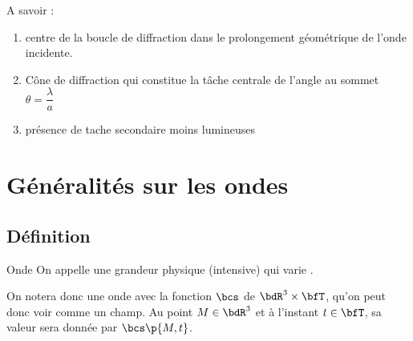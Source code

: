     \begin{minipage}{0.5\linewidth}
        \begin{center}
        \end{center}
    \end{minipage}
    \hfill
    \begin{minipage}{0.5\linewidth}
        A savoir :
        \begin{enumerate}
            \item centre de la boucle de diffraction dans le prolongement géométrique de l'onde incidente.
        
            \item Cône de diffraction qui constitue la tâche centrale de l'angle au sommet $\theta = \dfrac{\lambda}{a}$
            
            \item présence de tache secondaire moins lumineuses
        \end{enumerate}
    \end{minipage}
    
    \section{Généralités sur les ondes}

    \subsection{Définition}
    
    \begin{definition}{Onde}{}
        On appelle  une grandeur physique (intensive) qui varie .
    \end{definition}
    \begin{notation}
        On notera donc une onde avec la fonction $\bcs$ de $\bdR^3 \times \bfT$, qu'on peut donc voir comme un champ. Au point $M \in \bdR^3$ et à l'instant $t \in \bfT$, sa valeur sera donnée par $\bcs\p{M, t}$.
    \end{notation}
        

